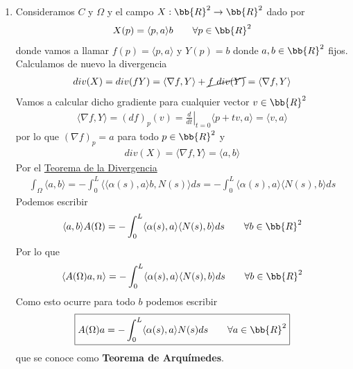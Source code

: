 \begin{observacion}
\begin{enumerate}[start=4]
        \item Consideramos $C$ y $\Omega$ y el campo $X:\bb{R}^2 \to \bb{R}^2$ dado por 
        \begin{gather*}
            X(p)=\langle p, a \rangle b \qquad \forall p \in \bb{R}^2
        \end{gather*}
        donde vamos a llamar $f(p)=\langle p, a \rangle$ y $Y(p)=b$ donde $a,b\in \bb{R}^2$ fijos. Calculamos de nuevo la divergencia
        \begin{gather*}
            div(X) = div(fY) = \langle \nabla f, Y \rangle + \cancel{f\ div(Y)} = \langle \nabla f, Y \rangle
        \end{gather*}
        Vamos a calcular dicho gradiente para cualquier vector $v\in \bb{R}^2$
        \begin{gather*}
            \langle \nabla f, Y \rangle = (df)_p(v) =\left. \frac{d}{dt}\right|_{t=0} \langle p+tv, a\rangle = \langle v,a\rangle
        \end{gather*}
        por lo que $(\nabla f)_p = a$ para todo $p\in \bb{R}^2$ y
        \begin{gather*}
            div(X) = \langle \nabla f, Y \rangle = \langle a, b \rangle
        \end{gather*}
        Por el \hyperref[teo:divergencia]{Teorema de la Divergencia}
        \begin{gather*}
            \int_\Omega \langle a,b \rangle = -\int_0^L \langle \langle \alpha(s), a \rangle b, N(s) \rangle ds = - \int_0^L \langle \alpha(s), a \rangle \langle N(s), b \rangle ds
        \end{gather*}
        Podemos escribir
        \begin{gather*}
            \langle a,b\rangle A(\Omega) = -\int_0^L \langle \alpha(s), a \rangle \langle N(s), b \rangle ds \qquad \forall b\in \bb{R}^2
        \end{gather*}
        Por lo que 
        \begin{gather*}
            \langle A(\Omega)a, n \rangle = -\int_0^L \langle \alpha(s), a \rangle \langle N(s), b \rangle ds \qquad \forall b\in \bb{R}^2
        \end{gather*}
        Como esto ocurre para todo $b$ podemos escribir
        \begin{gather*}
            \boxed{A(\Omega) a = - \int_0^L \langle \alpha(s), a \rangle N(s) ds \qquad \forall a \in \bb{R}^2}
        \end{gather*}
        que se conoce como \textbf{Teorema de Arquímedes}.


\end{enumerate}
\end{observacion}
